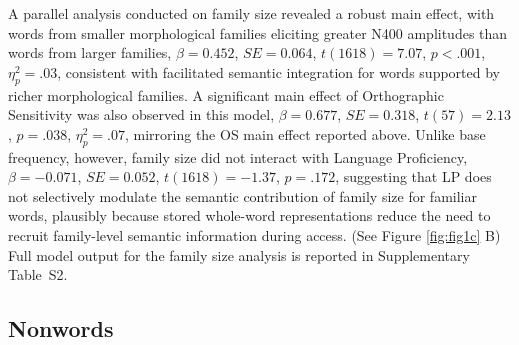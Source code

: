 \documentclass[utf8]{FrontiersinHarvard} %
\begin{document}
	A parallel analysis conducted on family size revealed a robust main effect, with words from smaller morphological families eliciting greater N400 amplitudes than words from larger families, $\beta = 0.452$, $SE = 0.064$, $t(1618) = 7.07$, $p < .001$, $\eta^2_p = .03$, consistent with facilitated semantic integration for words supported by richer morphological families. A significant main effect of Orthographic Sensitivity was also observed in this model, $\beta = 0.677$, $SE = 0.318$, $t(57) = 2.13$, $p = .038$, $\eta^2_p = .07$, mirroring the OS main effect reported above. Unlike base frequency, however, family size did not interact with Language Proficiency, $\beta = -0.071$, $SE = 0.052$, $t(1618) = -1.37$, $p = .172$, suggesting that LP does not selectively modulate the semantic contribution of family size for familiar words, plausibly because stored whole-word representations reduce the need to recruit family-level semantic information during access. (See Figure \ref{fig:fig1c} B) Full model output for the family size analysis is reported in Supplementary Table~S2.

	\subsection{Nonwords}
	
\end{document}
